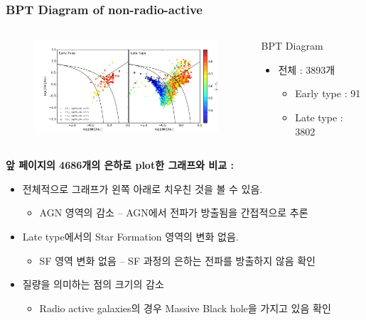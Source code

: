\documentclass[xcolor={dvipsnames,table}]{beamer}
\newcommand\SM{\fontsize{8}{7.2}\selectfont}
\newcommand\SSM{\fontsize{7}{7.2}\selectfont}
\begin{document}
\begin{frame}
  \frametitle{BPT Diagram of non-radio-active}
  \SM
  \begin{columns}
   \begin{figure}
    \centering
    \includegraphics[width=7cm, height=3.5cm]{BPT_nonradio.png}
   \end{figure}
   \centering
   \begin{block}{BPT Diagram}
    \begin{itemize}
     \item 전체 : 3893개
     \begin{itemize}
      \item Early type : 91
      \item Late type : 3802
     \end{itemize}
    \end{itemize}
   \end{block}
  \end{columns}
  \vspace{0.2cm}
  \textbf{앞 페이지의 4686개의 은하로 plot한 그래프와 비교 :}
  \begin{itemize}
   \item 전체적으로 그래프가 왼쪽 아래로 치우친 것을 볼 수 있음.
   \begin{itemize}
   \SSM
   [triangle]
    \item AGN 영역의 감소 – AGN에서 전파가 방출됨을 간접적으로 추론
   \end{itemize}
   \item Late type에서의 Star Formation 영역의 변화 없음.
   \begin{itemize}
   \SSM
   [triangle]
    \item SF 영역 변화 없음 – SF 과정의 은하는 전파를 방출하지 않음 확인
   \end{itemize}
   \item 질량을 의미하는 점의 크기의 감소
   \begin{itemize}
   \SSM
   [triangle]
    \item Radio active galaxies의 경우 Massive Black hole을 가지고 있음 확인
   \end{itemize}
  \end{itemize}
\end{frame}
\end{document}
